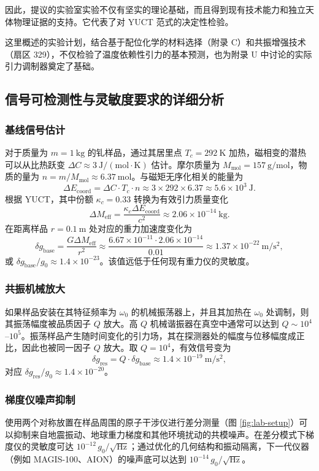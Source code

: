 \documentclass[12pt]{article}
\theoremstyle{remark}
\begin{document}
	因此，提议的实验室实验不仅有坚实的理论基础，而且得到现有技术能力和独立天体物理证据的支持。它代表了对 YUCT 范式的决定性检验。
	
	这里概述的实验计划，结合基于配位化学的材料选择（附录 C）和共振增强技术（扇区 329），不仅检验了温度依赖性引力的基本预测，也为附录 U 中讨论的实际引力调制器奠定了基础。
	
	\subsection{信号可检测性与灵敏度要求的详细分析}
	\label{subsec:signal-detectability}
	
	\subsubsection{基线信号估计}
	对于质量为 $m = 1\ \mathrm{kg}$ 的钆样品，通过其居里点 $T_c = 292\ \mathrm{K}$ 加热，磁相变的潜热可以从比热跃变 $\Delta C \approx 3\ \mathrm{J/(mol\cdot K)}$ 估计。摩尔质量为 $M_{\mathrm{mol}} = 157\ \mathrm{g/mol}$，物质的量为 $n = m / M_{\mathrm{mol}} \approx 6.37\ \mathrm{mol}$。与磁矩无序化相关的能量为
	\[
	\Delta E_{\mathrm{coord}} = \Delta C \cdot T_c \cdot n \approx 3 \times 292 \times 6.37 \approx 5.6\times10^{3}\ \mathrm{J}.
	\]
	根据 YUCT，其中份额 $\kappa_c = 0.33$ 转换为有效引力质量变化
	\[
	\Delta M_{\mathrm{eff}} = \frac{\kappa_c \Delta E_{\mathrm{coord}}}{c^2} \approx 2.06\times10^{-14}\ \mathrm{kg}.
	\]
	在距离样品 $r = 0.1\ \mathrm{m}$ 处对应的重力加速度变化为
	\[
	\delta g_{\mathrm{base}} = \frac{G \Delta M_{\mathrm{eff}}}{r^2} \approx \frac{6.67\times10^{-11} \cdot 2.06\times10^{-14}}{0.01} \approx 1.37\times10^{-22}\ \mathrm{m/s^2},
	\]
	或 $\delta g_{\mathrm{base}}/g_0 \approx 1.4\times10^{-23}$。该值远低于任何现有重力仪的灵敏度。
	
	\subsubsection{共振机械放大}
	如果样品安装在其特征频率为 $\omega_0$ 的机械振荡器上，并且其加热在 $\omega_0$ 处调制，则其振荡幅度被品质因子 $Q$ 放大。高 $Q$ 机械谐振器在真空中通常可以达到 $Q \sim 10^4$–$10^5$。振荡样品产生随时间变化的引力场，其在探测器处的幅度与位移幅度成正比，因此也被同一因子 $Q$ 放大。取 $Q = 10^4$，有效信号变为
	\[
	\delta g_{\mathrm{res}} = Q \cdot \delta g_{\mathrm{base}} \approx 1.4\times10^{-19}\ \mathrm{m/s^2},
	\]
	对应 $\delta g_{\mathrm{res}}/g_0 \approx 1.4\times10^{-20}$。
	
	\subsubsection{梯度仪噪声抑制}
	使用两个对称放置在样品周围的原子干涉仪进行差分测量（图 \ref{fig:lab-setup}）可以抑制来自地震振动、地球重力梯度和其他环境扰动的共模噪声。在差分模式下梯度仪的灵敏度可达 $10^{-12}\,g_0/\sqrt{\mathrm{Hz}}$；通过优化的几何结构和振动隔离，下一代仪器（例如 MAGIS-100、AION）的噪声底可以达到 $10^{-14}\,g_0/\sqrt{\mathrm{Hz}}$。
	
\end{document}
